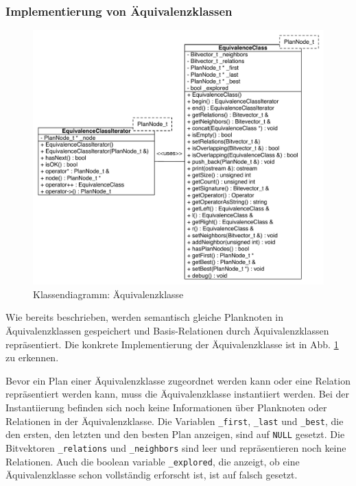 \subsubsection{Implementierung von Äquivalenzklassen}

\begin{figure}[ht]
  \centering
  \includegraphics[width=1\textwidth]{04_Implementierung/00_media/ClassEquivalenceClass.pdf}
  \caption{Klassendiagramm: Äquivalenzklasse}
  \label{ClassEquivalenceClass}
\end{figure}


Wie bereits beschrieben, werden semantisch gleiche Planknoten in Äquivalenzklassen gespeichert und Basis-Relationen durch Äquivalenzklassen repräsentiert. Die konkrete Implementierung der Äquivalenzklasse ist in Abb. \ref{ClassEquivalenceClass} zu erkennen.

Bevor ein Plan einer Äquivalenzklasse zugeordnet werden kann oder eine Relation repräsentiert werden kann, muss die Äquivalenzklasse instantiiert werden. Bei der Instantiierung befinden sich noch keine Informationen über Planknoten oder Relationen in der Äquivalenzklasse. Die Variablen \texttt{\_first}, \texttt{\_last} und \texttt{\_best}, die den ersten, den letzten und den besten Plan anzeigen, sind auf \texttt{NULL} gesetzt. Die Bitvektoren \texttt{\_relations} und \texttt{\_neighbors} sind leer und repräsentieren noch keine Relationen. Auch die boolean variable \texttt{\_explored}, die anzeigt, ob eine Äquivalenzklasse schon vollständig erforscht ist, ist auf falsch gesetzt.


